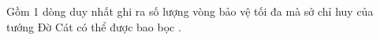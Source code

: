 Gồm 1 dòng duy nhất ghi ra số lượng vòng bảo vệ tối đa mà sở chỉ huy của tướng Đờ Cát có thể được bao bọc .  

\